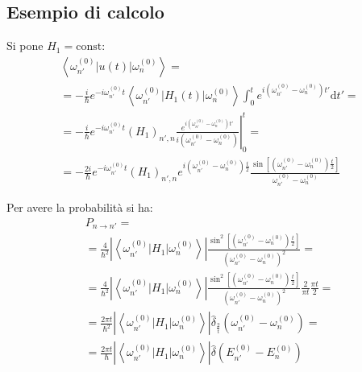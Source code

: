 \subsection{Esempio di calcolo} %
Si pone $H_1=\textrm{const}$:
\begin{equation}\begin{split}
\left\langle \omega _{n'}^{\left(0\right)}|u\left(t\right)|\omega _n^{\left(0\right)} \right\rangle=\\
=-\frac{i}{\hbar }e^{-i\omega _{n'}^{\left(0\right)}t}\left\langle \omega _{n'}^{\left(0\right)}|H_1\left(t\right)|\omega _n^{\left(0\right)} \right\rangle\int_0^t{e^{i\left(\omega _{n'}^{\left(0\right)}-\omega _n^{\left(0\right)}\right)t'}\textrm{d}t'}=\\
=-\frac{i}{\hbar }e^{-i\omega _{n'}^{\left(0\right)}t}\left(H_1\right)_{n',n}\left.\frac{e^{i\left(\omega _{n'}^{\left(0\right)}-\omega _n^{\left(0\right)}\right)t'}}{i\left(\omega _{n'}^{\left(0\right)}-\omega _n^{\left(0\right)}\right)}\right|_0^t=\\
=-\frac{2i}{\hbar }e^{-i\omega _{n'}^{\left(0\right)}t}\left(H_1\right)_{n',n}e^{i\left(\omega _{n'}^{\left(0\right)}-\omega _n^{\left(0\right)}\right)\frac{t}{2}}\frac{\sin{\left[{\left(\omega _{n'}^{\left(0\right)}-\omega _n^{\left(0\right)}\right)\frac{t}{2}}\right]}}{\omega _{n'}^{\left(0\right)}-\omega _n^{\left(0\right)}}
\end{split}\end{equation}

Per avere la probabilità si ha:
\begin{equation}\begin{split}
P_{n\to n'}=\\
=\frac{4}{\hbar ^2}\left|\left\langle\omega _{n'}^{\left(0\right)} \left|H_1\right| \omega _n^{\left(0\right)}\right\rangle\right|\frac{\sin^2{\left[{\left(\omega _{n'}^{\left(0\right)}-\omega _n^{\left(0\right)}\right)\frac{t}{2}}\right]}}{\left(\omega _{n'}^{\left(0\right)}-\omega _n^{\left(0\right)}\right)^2}=\\
=\frac{4}{\hbar ^2}\left|\left\langle\omega _{n'}^{\left(0\right)} \left|H_1\right| \omega _n^{\left(0\right)}\right\rangle\right|\frac{\sin^2{\left[{\left(\omega _{n'}^{\left(0\right)}-\omega _n^{\left(0\right)}\right)\frac{t}{2}}\right]}}{\left(\omega _{n'}^{\left(0\right)}-\omega _n^{\left(0\right)}\right)^2}\frac{2}{\pi t}\frac{\pi t}{2}=\\
=\frac{2\pi t}{\hbar ^2}\left|\left\langle\omega _{n'}^{\left(0\right)} \left|H_1\right| \omega _n^{\left(0\right)}\right\rangle\right|\hat\delta_{\frac{2}{t}}\left(\omega _{n'}^{\left(0\right)}-\omega _n^{\left(0\right)}\right)=\\
=\frac{2\pi t}{\hbar}\left|\left\langle\omega _{n'}^{\left(0\right)} \left|H_1\right| \omega _n^{\left(0\right)}\right\rangle\right|\hat\delta\left(E _{n'}^{\left(0\right)}-E _n^{\left(0\right)}\right)
\end{split}\end{equation}

